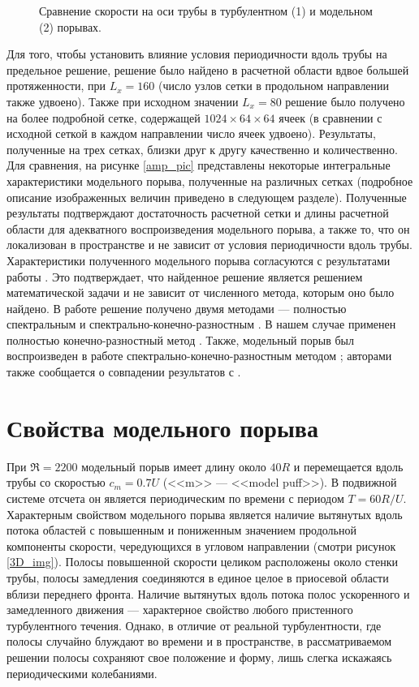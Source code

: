 \begin{figure}
\caption{Сравнение скорости на оси трубы в турбулентном (1) и модельном (2) порывах.}
\label{ucl_cmp_img}
\end{figure}

Для того, чтобы установить влияние условия периодичности вдоль трубы на предельное решение, решение было найдено в расчетной области вдвое большей протяженности, при $L_x = 160$ (число узлов сетки в продольном направлении также удвоено). Также при исходном значении $L_x = 80$ решение было получено на более подробной сетке, содержащей $1024 \times 64 \times 64$ ячеек (в сравнении с исходной сеткой в каждом направлении число ячеек удвоено). Результаты, полученные на трех сетках, близки друг к другу качественно и количественно. Для сравнения, на рисунке \ref{amp_pic} представлены некоторые интегральные характеристики модельного порыва, полученные на различных сетках (подробное описание изображенных величин приведено в следующем разделе). Полученные результаты подтверждают достаточность расчетной сетки и длины расчетной области для адекватного воспроизведения модельного порыва, а также то, что он локализован в пространстве и не зависит от условия периодичности вдоль трубы. Характеристики полученного модельного порыва согласуются с результатами работы \cite{Avila2013}. Это подтверждает, что найденное решение является решением математической задачи и не зависит от численного метода, которым оно было найдено. В работе \cite{Avila2013} решение получено двумя методами --- полностью спектральным \cite{Meseguer2007} и спектрально-конечно-разностным \cite{Willis2009}. В нашем случае применен полностью конечно-разностный метод \cite{Nikitin2006}. Также, модельный порыв был воспроизведен в работе \cite{Chantry2014} спектрально-конечно-разностным методом \cite{Willis2009}; авторами также сообщается о совпадении результатов с \cite{Avila2013}. 


\section{Свойства модельного порыва}

При $\Re=2200$ модельный порыв имеет длину около $40R$ и перемещается вдоль трубы со скоростью $c_m = 0.7U$ (<<m>> --- <<model puff>>). В подвижной системе отсчета он является периодическим по времени с периодом $T = 60 R/U$. Характерным свойством модельного порыва является наличие вытянутых вдоль потока областей с повышенным и пониженным значением продольной компоненты скорости, чередующихся в угловом направлении (смотри рисунок \ref{3D_img}). Полосы повышенной скорости целиком расположены около стенки трубы, полосы замедления соединяются в единое целое в приосевой области вблизи переднего фронта. Наличие вытянутых вдоль потока полос ускоренного и замедленного движения --- характерное свойство любого пристенного турбулентного течения. Однако, в отличие от реальной турбулентности, где полосы случайно блуждают во времени и в пространстве, в рассматриваемом решении полосы сохраняют свое положение и форму, лишь слегка искажаясь периодическими колебаниями. 


